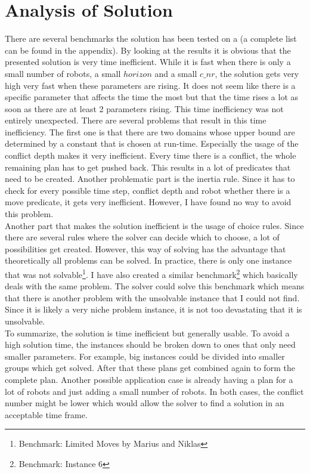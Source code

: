 \documentclass[runningheads]{llncs}
\begin{document}
\section{Analysis of Solution}
There are several benchmarks the solution has been tested on a (a complete list can be found in the appendix). By looking at the results it is obvious that the presented solution is very time inefficient. While it is fast when there is only a small number of robots, a small $horizon$ and a small $c\_nr$, the solution gets very high very fast when these parameters are rising. It does not seem like there is a specific parameter that affects the time the most but that the time rises a lot as soon as there are at least 2 parameters rising. This time inefficiency was not entirely unexpected. There are several problems that result in this time inefficiency. The first one is that there are two domains whose upper bound are determined by a constant that is chosen at run-time. Especially the usage of the conflict depth makes it very inefficient. Every time there is a conflict, the whole remaining plan has to get pushed back. This results in a lot of predicates that need to be created. Another problematic part is the inertia rule. Since it has to check for every possible time step, conflict depth and robot whether there is a move predicate, it gets very inefficient. However, I have found no way to avoid this problem. \\
Another part that makes the solution inefficient is the usage of choice rules. Since there are several rules where the solver can decide which to choose, a lot of possibilities get created. However, this way of solving has the advantage that theoretically all problems can be solved. In practice, there is only one instance that was not solvable\footnote{Benchmark: Limited Moves by Marius and Niklas}. I have also created a similar benchmark\footnote{Benchmark: Instance 6} which basically deals with the same problem. The solver could solve this benchmark which means that there is another problem with the unsolvable instance that I could not find. Since it is likely a very niche problem instance, it is not too devastating that it is unsolvable. \\
To summarize, the solution is time inefficient but generally usable. To avoid a high solution time, the instances should be broken down to ones that only need smaller parameters. For example, big instances could be divided into smaller groups which get solved. After that these plans get combined again to form the complete plan. Another possible application case is already having a plan for a lot of robots and just adding a small number of robots. In both cases, the conflict number might be lower which would allow the solver to find a solution in an acceptable time frame.
\end{document}

